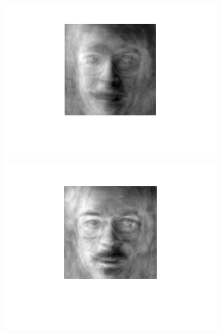 \begin{figure}[ht!]
    \centering
    \begin{minipage}{0.19\textwidth}
    \includegraphics[width = 1\textwidth]{fig/petyr_80.png}
    \end{minipage}
     \begin{minipage}{0.19\textwidth}
    \includegraphics[width = 1\textwidth]{fig/petyr_90.png}
    \end{minipage}
     \begin{minipage}{0.19\textwidth}

\end{minipage}
\end{figure}
